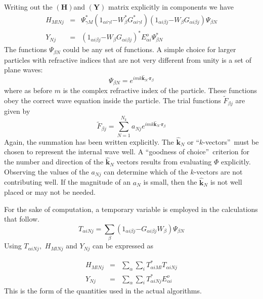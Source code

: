 \documentclass{article}
\begin{document}
Writing out the $\left( \mathbf{H}\right) $and $(\mathbf{Y})$ matrix
explicitly in components we have 
\begin{eqnarray}
H_{MlNj} &=&\Psi _{\gamma M}^{\ast }\left( 1_{\alpha i\gamma l}\mathbf{-}%
W_{\beta }^{\ast }G_{\alpha i\gamma l}^{\ast }\right) \left( 1_{\alpha
i\beta j}\mathbf{-}W_{\beta }G_{\alpha i\beta j}\right) \Psi _{\beta N} 
\nonumber \\
Y_{Nj} &=&\left( 1_{\alpha i\beta j}\mathbf{-}W_{\beta }G_{\alpha i\beta
j}\right) ^{\ast }E_{\alpha i}^{o}\Psi _{\beta N}^{\ast }
\end{eqnarray}%
The functions $\Psi _{\beta N}$ could be any set of functions. A simple
choice for larger particles with refractive indices that are not very
different from unity is a set of plane waves: 
\begin{equation}
\Psi _{\beta N}=e^{imk\mathbf{\hat{k}}_{N}\mathbf{\cdot r}_{\beta }}
\end{equation}%
where as before $m$ is the complex refractive index of the particle. These
functions obey the correct wave equation inside the particle. The trial
functions $\tilde{F}_{\beta j}$ are given by 
\begin{equation}
\tilde{F}_{\beta j}\mathbf{=}\sum_{N=1}^{N_{k}}a_{Nj}e^{imk\mathbf{\hat{k}}%
_{N}\mathbf{\cdot r}_{\beta }}  \label{Ftilde}
\end{equation}%
Again, the summation has been written explicitly. The $\mathbf{\hat{k}}_{N}$
or \textquotedblleft $k$-vectors\textquotedblright\ must be chosen to
represent the internal wave well. A \textquotedblleft goodness of
choice\textquotedblright\ criterion for the number and direction of the $%
\mathbf{\hat{k}}_{N}$ vectors results from evaluating $\Phi $ explicitly.
Observing the values of the $a_{Nj}$ can determine which of the $k$-vectors
are not contributing well. If the magnitude of an $a_{N}$ is small, then the 
$\mathbf{\hat{k}}_{N}$ is not well placed or may not be needed.

For the sake of computation, a temporary variable is employed in the
calculations that follow. 
\begin{equation}
T_{\alpha iNj}=\sum_{\beta }\left( 1_{\alpha i\beta j}\mathbf{-}G_{\alpha
i\beta j}W_{\beta }\right) \Psi _{\beta N}
\end{equation}
Using $T_{\alpha iNj},$ $H_{MlNj}$ and $Y_{Nj}$ can be expressed as

\begin{eqnarray}
H_{MlNj} &=&\sum_{\alpha }\sum_{i}T_{\alpha iMl}^{\ast }T_{\alpha iNj} \\
Y_{Nj} &=&\sum_{\alpha }\sum_{i}T_{\alpha iNj}^{\ast }E_{\alpha i}^{o} 
\nonumber
\end{eqnarray}%
This is the form of the quantities used in the actual algorithms.
\end{document}
